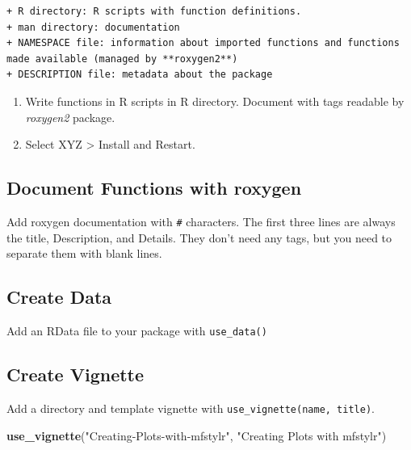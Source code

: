 \documentclass[
]{book}
\newenvironment{Shaded}{\begin{snugshade}}{\end{snugshade}}
\newcommand{\KeywordTok}[1]{\textcolor[rgb]{0.13,0.29,0.53}{\textbf{#1}}}
\newcommand{\NormalTok}[1]{#1}
\newcommand{\StringTok}[1]{\textcolor[rgb]{0.31,0.60,0.02}{#1}}
\begin{document}
\begin{verbatim}
+ R directory: R scripts with function definitions.
+ man directory: documentation
+ NAMESPACE file: information about imported functions and functions made available (managed by **roxygen2**)
+ DESCRIPTION file: metadata about the package
\end{verbatim}

\begin{enumerate}
\def\labelenumi{\arabic{enumi}.}
\setcounter{enumi}{1}
\item
  Write functions in R scripts in R directory. Document with tags readable by \emph{roxygen2} package.
\item
  Select XYZ \textgreater{} Install and Restart.
\end{enumerate}

\hypertarget{document-functions-with-roxygen}{%
\subsection{Document Functions with roxygen}\label{document-functions-with-roxygen}}

Add roxygen documentation with \texttt{\#\textquotesingle{}} characters. The first three lines are always the title, Description, and Details. They don't need any tags, but you need to separate them with blank lines.

\hypertarget{create-data}{%
\subsection*{Create Data}\label{create-data}}

Add an RData file to your package with \texttt{use\_data()}

\hypertarget{create-vignette}{%
\subsection*{Create Vignette}\label{create-vignette}}

Add a directory and template vignette with \texttt{use\_vignette(name,\ title)}.

\begin{Shaded}
\begin{Highlighting}[]
\KeywordTok{use_vignette}\NormalTok{(}\StringTok{"Creating-Plots-with-mfstylr"}\NormalTok{, }\StringTok{"Creating Plots with mfstylr"}\NormalTok{)}
\end{Highlighting}
\end{Shaded}
\end{document}
